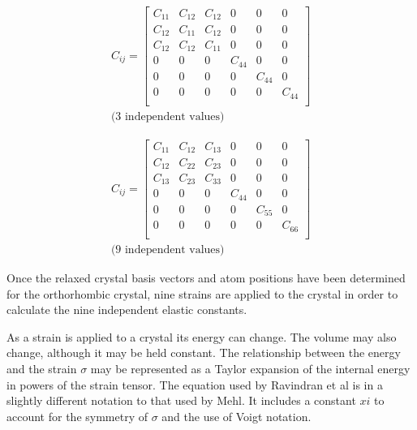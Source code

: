 \begin{equation}
    \begin{split}
      C_{ij} = 
      \begin{bmatrix}
      C_{11} & C_{12} & C_{12} & 0      & 0      & 0      \\
      C_{12} & C_{11} & C_{12} & 0      & 0      & 0      \\
      C_{12} & C_{12} & C_{11} & 0      & 0      & 0      \\
      0      & 0      & 0      & C_{44} & 0      & 0      \\
      0      & 0      & 0      & 0      & C_{44} & 0      \\
      0      & 0      & 0      & 0      & 0      & C_{44} \\
      \end{bmatrix}\\
      \text{(3 independent values)}
    \end{split}
  \label{eq:eqCubicEC}
\end{equation}


\begin{equation}
    \begin{split}
      C_{ij} = 
      \begin{bmatrix}
      C_{11} & C_{12} & C_{13} & 0      & 0      & 0      \\
      C_{12} & C_{22} & C_{23} & 0      & 0      & 0      \\
      C_{13} & C_{23} & C_{33} & 0      & 0      & 0      \\
      0      & 0      & 0      & C_{44} & 0      & 0      \\
      0      & 0      & 0      & 0      & C_{55} & 0      \\
      0      & 0      & 0      & 0      & 0      & C_{66} \\
      \end{bmatrix}\\
      \text{(9 independent values)}
    \end{split}
    \label{eq:eqOrthoRhombicEC}
\end{equation}


Once the relaxed crystal basis vectors and atom positions have been determined for the orthorhombic crystal, nine strains are applied to the crystal \cite{dftrfkj} in order to calculate the nine independent elastic constants.


\FloatBarrier

As a strain is applied to a crystal its energy can change.  The volume may also change, although it may be held constant.  The relationship between the energy and the strain $\sigma$ may be represented as a Taylor expansion of the internal energy in powers of the strain tensor\cite{dftrfkj}.  The equation used by Ravindran et al is in a slightly different notation to that used by Mehl\cite{elasticpropertiesmehl}.  It includes a constant $xi$ to account for the symmetry of $\sigma$ and the use of Voigt notation.

